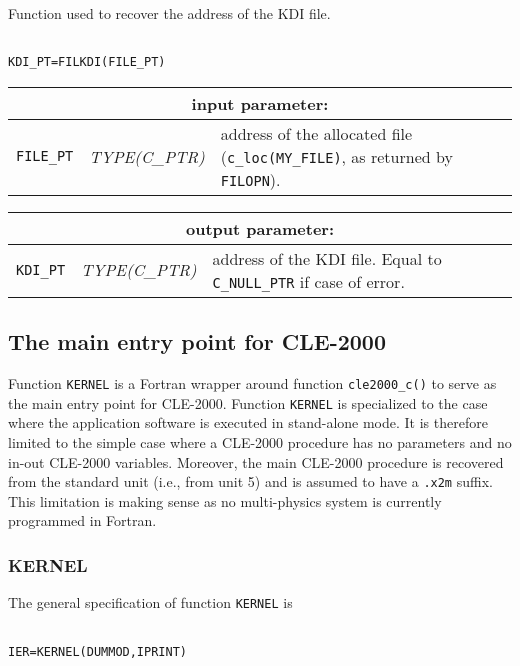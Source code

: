Function used to recover the address of the KDI file.

\begin{verbatim}

KDI_PT=FILKDI(FILE_PT)
\end{verbatim}

\noindent
\begin{tabular}{|p{1.5cm}|p{3cm}|p{10cm}|}
\hline
\multicolumn{3}{|c|}{\bf input parameter:} \\
\hline
{\tt FILE\_PT} & {\it TYPE(C\_PTR)} &  address of the allocated file ({\tt c\_loc(MY\_FILE)}, as returned by {\tt FILOPN}). \\
\hline
\end{tabular}

\vskip 0.4cm
\noindent
\begin{tabular}{|p{1.5cm}|p{3cm}|p{10cm}|}
\hline
\multicolumn{3}{|c|}{\bf output parameter:} \\
\hline
{\tt KDI\_PT} & {\it TYPE(C\_PTR)}  & address of the KDI file. Equal to {\tt C\_NULL\_PTR} if case of error.  \\
\hline
\end{tabular}

\vskip 0.8cm

\subsection {The main entry point for CLE-2000}

Function {\tt KERNEL} is a Fortran wrapper around function {\tt cle2000\_c()} to serve as the main entry point for CLE-2000.
Function {\tt KERNEL} is specialized to the case where the application software is executed in stand-alone mode. It is
therefore limited to the simple case where a CLE-2000 procedure has no parameters and no in-out CLE-2000 variables.
Moreover, the main CLE-2000 procedure is recovered from the standard unit (i.e., from unit 5) and is assumed to have a {\tt .x2m}
suffix. This limitation is making sense as no multi-physics system is currently programmed in Fortran.

\subsubsection{KERNEL}

The general specification of function {\tt KERNEL} is

\begin{verbatim}

IER=KERNEL(DUMMOD,IPRINT)
\end{verbatim}

